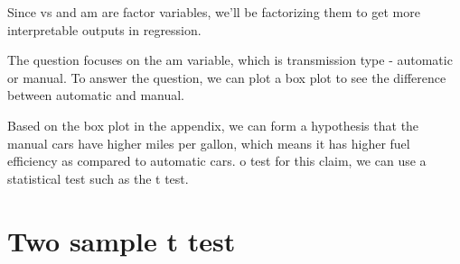 \documentclass[
]{article}
\newenvironment{Shaded}{\begin{snugshade}}{\end{snugshade}}
\newcommand{\FunctionTok}[1]{\textcolor[rgb]{0.13,0.29,0.53}{\textbf{#1}}}
\newcommand{\NormalTok}[1]{#1}
\newcommand{\SpecialCharTok}[1]{\textcolor[rgb]{0.81,0.36,0.00}{\textbf{#1}}}
\newcommand{\StringTok}[1]{\textcolor[rgb]{0.31,0.60,0.02}{#1}}
\begin{document}
Since vs and am are factor variables, we'll be factorizing them to get
more interpretable outputs in regression.

The question focuses on the am variable, which is transmission type -
automatic or manual. To answer the question, we can plot a box plot to
see the difference between automatic and manual.

Based on the box plot in the appendix, we can form a hypothesis that the
manual cars have higher miles per gallon, which means it has higher fuel
efficiency as compared to automatic cars. o test for this claim, we can
use a statistical test such as the t test.

\section{Two sample t test}\label{two-sample-t-test}

\begin{Shaded}
\end{Shaded}
\end{document}
